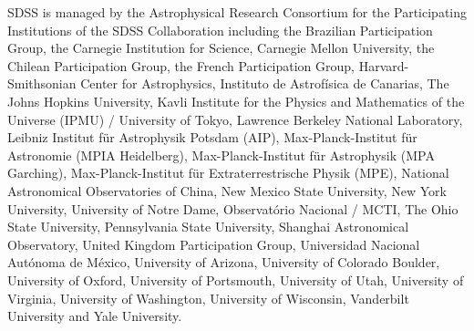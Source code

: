 \documentclass[useAMS,usenatbib]{mn2e}
\begin{document}
SDSS is managed by the Astrophysical Research Consortium for the Participating Institutions of the SDSS Collaboration including the Brazilian Participation Group, the Carnegie Institution for Science, Carnegie Mellon University, the Chilean Participation Group, the French Participation Group, Harvard-Smithsonian Center for Astrophysics, Instituto de Astrof\'isica de Canarias, The Johns Hopkins University, Kavli Institute for the Physics and Mathematics of the Universe (IPMU) / University of Tokyo, Lawrence Berkeley National Laboratory, Leibniz Institut für Astrophysik Potsdam (AIP), Max-Planck-Institut f\"ur Astronomie (MPIA Heidelberg), Max-Planck-Institut für Astrophysik (MPA Garching), Max-Planck-Institut f\"ur Extraterrestrische Physik (MPE), National Astronomical Observatories of China, New Mexico State University, New York University, University of Notre Dame, Observat\'orio Nacional / MCTI, The Ohio State University, Pennsylvania State University, Shanghai Astronomical Observatory, United Kingdom Participation Group, Universidad Nacional Aut\'onoma de M\'exico, University of Arizona, University of Colorado Boulder, University of Oxford, University of Portsmouth, University of Utah, University of Virginia, University of Washington, University of Wisconsin, Vanderbilt University and Yale University.


  



\end{document}
